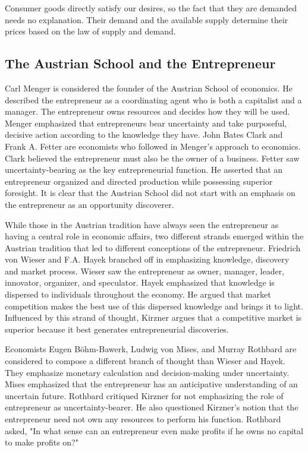 Consumer goods directly satisfy our desires, so the fact that they are demanded needs no explanation. Their demand and the available supply determine their prices based on the law of supply and demand.

\subsection{The Austrian School and the Entrepreneur}

Carl Menger is considered the founder of the Austrian School of economics. He described the entrepreneur as a coordinating agent who is both a capitalist and a manager. The entrepreneur owns resources and decides how they will be used. Menger emphasized that entrepreneurs bear uncertainty and take purposeful, decisive action according to the knowledge they have. John Bates Clark and Frank A. Fetter are economists who followed in Menger's approach to economics. Clark believed the entrepreneur must also be the owner of a business. Fetter saw uncertainty-bearing as the key entrepreneurial function. He asserted that an entrepreneur organized and directed production while possessing superior foresight. It is clear that the Austrian School did not start with an emphasis on the entrepreneur as an opportunity discoverer.

While those in the Austrian tradition have always seen the entrepreneur as having a central role in economic affairs, two different strands emerged within the Austrian tradition that led to different conceptions of the entrepreneur. Friedrich von Wieser and F.A. Hayek branched off in emphasizing knowledge, discovery and market process. Wieser saw the entrepreneur as owner, manager, leader, innovator, organizer, and speculator. Hayek emphasized that knowledge is dispersed to individuals throughout the economy. He argued that market competition makes the best use of this dispersed knowledge and brings it to light. Influenced by this strand of thought, Kirzner argues that a competitive market is superior because it best generates entrepreneurial discoveries.

Economists Eugen Böhm-Bawerk, Ludwig von Mises, and Murray Rothbard are considered to compose a different branch of thought than Wieser and Hayek. They emphasize monetary calculation and decision-making under uncertainty. Mises emphasized that the entrepreneur has an anticipative understanding of an uncertain future. Rothbard critiqued Kirzner for not emphasizing the role of entrepreneur as uncertainty-bearer. He also questioned Kirzner's notion that the entrepreneur need not own any resources to perform his function. Rothbard asked, "In what sense can an entrepreneur even make profits if he owns no capital to make profits on?"
